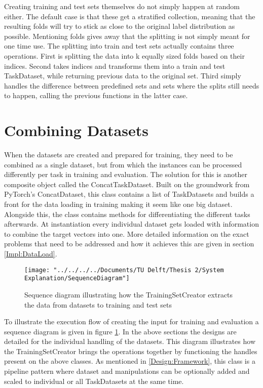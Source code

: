 Creating training and test sets themselves do not simply happen at random either. The default case is that these get a stratified collection, meaning that the resulting folds will try to stick as close to the original label distribution as possible. Mentioning folds gives away that the splitting is not simply meant for one time use. The splitting into train and test sets actually contains three operations. First is splitting the data into k equally sized folds based on their indices. Second takes indices and transforms them into a train and test TaskDataset, while returning previous data to the original set. Third simply handles the difference between predefined sets and sets where the splits still needs to happen, calling the previous functions in the latter case. \\



\section{Combining Datasets} \label{Design:Combining}

When the datasets are created and prepared for training, they need to be combined as a single dataset, but from which the instances can be processed differently per task in training and evaluation. The solution for this is another composite object called the ConcatTaskDataset. Built on the groundwork from PyTorch's ConcatDataset, this class contains a list of TaskDatasets and builds a front for the data loading in training making it seem like one big dataset. Alongside this, the class contains methods for differentiating the different tasks afterwards. At instantiation every individual dataset gets loaded with information to combine the target vectors into one. More detailed information on the exact problems that need to be addressed and how it achieves this are given in section \ref{Impl:DataLoad}. \\

\begin{figure}
	\centering
	\texttt{[image: "../../../../Documents/TU Delft/Thesis 2/System Explanation/SequenceDiagram"]}
	\caption{Sequence diagram illustrating how the TrainingSetCreator extracts the data from datasets to training and test sets}
	\label{fig:sequencediagram}
\end{figure}

To illustrate the execution flow of creating the input for training and evaluation a sequence diagram is given in figure \ref{fig:sequencediagram}. In the above sections the designs are detailed for the individual handling of the datasets. This diagram illustrates how the TrainingSetCreator brings the operations together by functioning the handles present on the above classes. As mentioned in \ref{Design:Framework}, this class is a pipeline pattern where dataset and manipulations can be optionally added and scaled to individual or all TaskDatasets at the same time.\\

